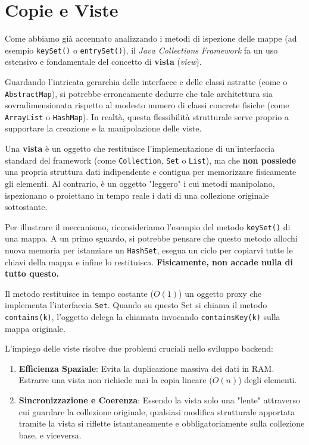 \section{Copie e Viste}

Come abbiamo già accennato analizzando i metodi di ispezione delle mappe (ad esempio \texttt{keySet()} o \texttt{entrySet()}), il \textit{Java Collections Framework} fa un uso estensivo e fondamentale del concetto di \textbf{vista} (\textit{view}).

Guardando l'intricata gerarchia delle interfacce e delle classi astratte (come  o \texttt{AbstractMap}), si potrebbe erroneamente dedurre che tale architettura sia sovradimensionata rispetto al modesto numero di classi concrete fisiche (come \texttt{ArrayList} o \texttt{HashMap}). In realtà, questa flessibilità strutturale serve proprio a supportare la creazione e la manipolazione delle viste.

Una \textbf{vista} è un oggetto che restituisce l'implementazione di un'interfaccia standard del framework (come \texttt{Collection}, \texttt{Set} o \texttt{List}), ma che \textbf{non possiede} una propria struttura dati indipendente e contigua per memorizzare fisicamente gli elementi. Al contrario, è un oggetto "leggero" i cui metodi manipolano, ispezionano o proiettano in tempo reale i dati di una collezione originale sottostante.

Per illustrare il meccanismo, riconsideriamo l'esempio del metodo \texttt{keySet()} di una mappa. A un primo sguardo, si potrebbe pensare che questo metodo allochi nuova memoria per istanziare un \texttt{HashSet}, esegua un ciclo per copiarvi tutte le chiavi della mappa e infine lo restituisca. \textbf{Fisicamente, non accade nulla di tutto questo.} 

Il metodo restituisce in tempo costante ($O(1)$) un oggetto proxy che implementa l'interfaccia \texttt{Set}. Quando su questo Set si chiama il metodo \texttt{contains(k)}, l'oggetto delega la chiamata invocando \texttt{containsKey(k)} sulla mappa originale.

\begin{observation}
L'impiego delle viste risolve due problemi cruciali nello sviluppo backend:
\begin{enumerate}
    \item \textbf{Efficienza Spaziale}: Evita la duplicazione massiva dei dati in RAM. Estrarre una vista non richiede mai la copia lineare ($O(n)$) degli elementi.
    \item \textbf{Sincronizzazione e Coerenza}: Essendo la vista solo una "lente" attraverso cui guardare la collezione originale, qualsiasi modifica strutturale apportata tramite la vista si riflette istantaneamente e obbligatoriamente sulla collezione base, e viceversa.
\end{enumerate}
\end{observation}

